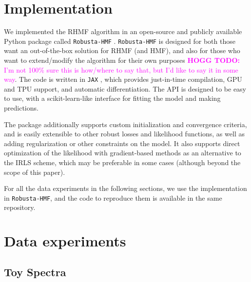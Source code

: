 \documentclass[onecolumn,floatfix]{aastex631}
\newcommand{\hoggtodo}[1]{\textcolor{magenta}{\textbf{HOGG TODO:} #1}}
\begin{document}
\section{Implementation}

We implemented the RHMF algorithm in an open-source and publicly available Python package called \texttt{Robusta-HMF} \citep{hilder2026}.
\texttt{Robusta-HMF} is designed for both those want an out-of-the-box solution for RHMF (and HMF), and also for those who want to extend/modify the algorithm for their own purposes \hoggtodo{I'm not 100\% sure this is how/where to say that, but I'd like to say it in some way}.
The code is written in \texttt{JAX} \citep{jax2018github}, which provides just-in-time compilation, GPU and TPU support, and automatic differentiation.
The API is designed to be easy to use, with a scikit-learn-like \citep{scikit-learn} interface for fitting the model and making predictions.

The package additionally supports custom initialization and convergence criteria, and is easily extensible to other robust losses and likelihood functions, as well as adding regularization or other constraints on the model.
It also supports direct optimization of the likelihood with gradient-based methods as an alternative to the IRLS scheme, which may be preferable in some cases (although beyond the scope of this paper).

For all the data experiments in the following sections, we use the implementation in \texttt{Robusta-HMF}, and the code to reproduce them is available in the same repository.

\section{Data experiments}

\subsection{Toy Spectra} \label{sec:toy}
\end{document}
